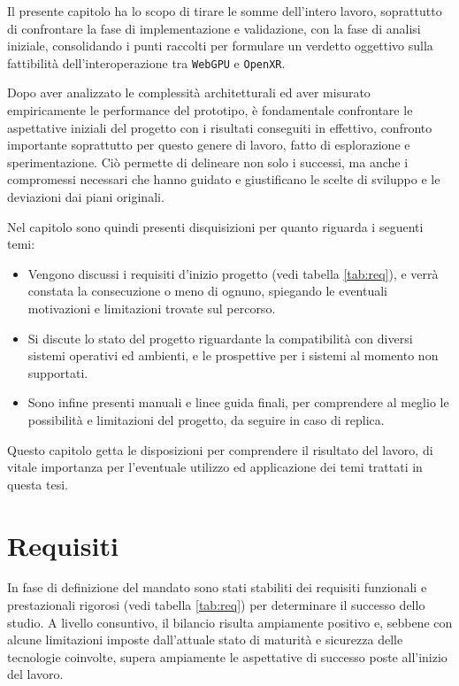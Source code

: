 \documentclass[a4paper, 11pt, twoside]{report}
\begin{document}
Il presente capitolo ha lo scopo di tirare le somme dell'intero lavoro, soprattutto di confrontare la fase di
implementazione e validazione, con la fase di analisi iniziale, consolidando i punti raccolti per formulare un verdetto
oggettivo sulla fattibilità dell'interoperazione tra \texttt{WebGPU} e \texttt{\gls{OpenXR}}.

Dopo aver analizzato le complessità architetturali ed aver misurato empiricamente le performance del prototipo, è
fondamentale confrontare le aspettative iniziali del progetto con i risultati conseguiti in effettivo, confronto
importante soprattutto per questo genere di lavoro, fatto di esplorazione e sperimentazione.
Ciò permette di delineare non solo i successi, ma anche i compromessi necessari che hanno guidato e giustificano le
scelte di sviluppo e le deviazioni dai piani originali.

Nel capitolo sono quindi presenti disquisizioni per quanto riguarda i seguenti temi:

\begin{itemize}
    \item Vengono discussi i requisiti d'inizio progetto (vedi tabella \ref{tab:req}), e verrà constata la consecuzione
        o meno di ognuno, spiegando le eventuali motivazioni e limitazioni trovate sul percorso.
    \item Si discute lo stato del progetto riguardante la compatibilità con diversi sistemi operativi ed ambienti, e le
        prospettive per i sistemi al momento non supportati.
    \item Sono infine presenti manuali e linee guida finali, per comprendere al meglio le possibilità e limitazioni del
        progetto, da seguire in caso di replica.
\end{itemize}

Questo capitolo getta le disposizioni per comprendere il risultato del lavoro, di vitale importanza per l'eventuale
utilizzo ed applicazione dei temi trattati in questa tesi.

\newpage

\section{Requisiti}

In fase di definizione del mandato sono stati stabiliti dei requisiti funzionali e prestazionali rigorosi (vedi tabella
\ref{tab:req}) per determinare il successo dello studio.
A livello consuntivo, il bilancio risulta ampiamente positivo e, sebbene con alcune limitazioni imposte dall'attuale
stato di maturità e sicurezza delle tecnologie coinvolte, supera ampiamente le aspettative di successo poste all'inizio
del lavoro.
\end{document}
